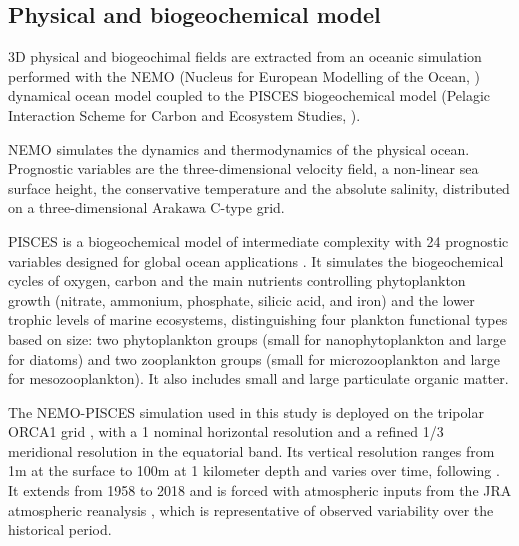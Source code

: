 \subsection{Physical and biogeochemical model}
\label{sec:nemo}

3D physical and biogeochimal fields are extracted from an oceanic simulation performed with the NEMO (Nucleus for European Modelling of the Ocean, \citealt{madecNEMOOceanEngine2019}) dynamical ocean model coupled to the PISCES biogeochemical model (Pelagic Interaction Scheme for Carbon and Ecosystem Studies, \citealt{aumontPISCESv2OceanBiogeochemical2015}). 

NEMO simulates the dynamics and thermodynamics of the physical ocean. Prognostic variables are
the three-dimensional velocity field, a non-linear sea surface height, the
conservative temperature and the absolute salinity, distributed on a three-dimensional Arakawa C-type grid.

PISCES is a biogeochemical model of intermediate complexity with 24 prognostic variables designed for global ocean applications \citep{aumontPISCESv2OceanBiogeochemical2015}. It simulates the biogeochemical cycles of oxygen, carbon and the main nutrients controlling phytoplankton growth (nitrate, ammonium, phosphate, silicic acid, and iron) and the lower trophic levels of marine ecosystems, distinguishing four plankton functional types based on size: two phytoplankton groups (small for nanophytoplankton and large for diatoms) and two zooplankton groups (small for microzooplankton and large for mesozooplankton). It also includes small and large particulate organic matter.

The NEMO-PISCES simulation used in this study is deployed on the tripolar ORCA1 grid \citep{madecGlobalOceanMesh1996}, with a 1\degree{} nominal horizontal resolution and a refined 1/3\degree{} meridional resolution in the equatorial band. Its vertical resolution ranges from 1m at the surface to 100m at 1 kilometer depth and varies over time, following \cite{levierFreeSurfaceVariable2007}. It extends from 1958 to 2018 and is forced with atmospheric inputs from the JRA atmospheric reanalysis \citep{kobayashiJRA55ReanalysisGeneral2015}, which is representative of observed variability over the historical period. 

